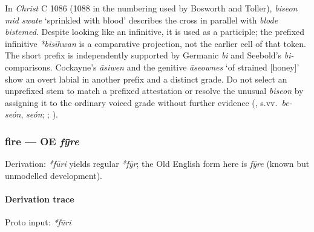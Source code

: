 \documentclass[
  british,
  a4paper,
]{article}
\providecommand{\Recon}[1]{\emph{*#1}}
\begin{document}
In \emph{Christ} C 1086 (1088 in the numbering used by Bosworth and
Toller), \emph{biseon mid swate} `sprinkled with blood' describes the
cross in parallel with \emph{blode bistemed}. Despite looking like an
infinitive, it is used as a participle; the prefixed infinitive
\emph{*bisīhwan} is a comparative projection, not the earlier cell of
that token. The short prefix is independently supported by Germanic
\emph{bi} and Seebold's \emph{bi-} comparisons. Cockayne's \emph{āsiwen}
and the genitive \emph{āseownes} `of strained {[}honey{]}' show an overt
labial in another prefix and a distinct grade. Do not select an
unprefixed stem to match a prefixed attestation or resolve the unusual
\emph{biseon} by assigning it to the ordinary voiced grade without
further evidence (, s.vv.~\emph{be-seón}, \emph{seón};
;
).

\subsubsection{\texorpdfstring{fire --- OE
\emph{fȳre}}{fire --- OE fȳre}}\label{fire-oe-fux233re}

Derivation: \emph{*fūri} yields regular \Recon{fȳr}; the Old English
form here is \emph{fȳre} (known but unmodelled development).

\paragraph{Derivation trace}\label{derivation-trace-179}

Proto input: \emph{*fūri}

\begingroup
\setlength{\fboxsep}{6pt}
\end{document}
